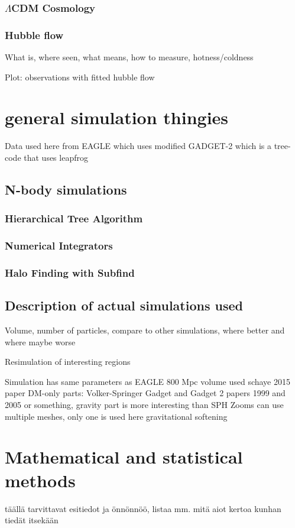 \documentclass[english, oneside]{HYgradu}
\begin{document}
\subsection{$\Lambda$CDM Cosmology}


\subsection{Hubble flow}
What is, where seen, what means, how to measure, hotness/coldness

Plot: observations with fitted hubble flow


\chapter{general simulation thingies}
Data used here from EAGLE which uses modified GADGET-2 which is a tree-code that uses leapfrog
\section{N-body simulations}
\subsection{Hierarchical Tree Algorithm}
\subsection{Numerical Integrators}
\subsection{Halo Finding with Subfind} %

\section{Description of actual simulations used}
Volume, number of particles, compare to other simulations, where better and where maybe worse

Resimulation of interesting regions

Simulation has same parameters as EAGLE
800 Mpc volume used
schaye 2015 paper
DM-only parts: Volker-Springer Gadget and Gadget 2 papers 1999 and 2005 or something,     gravity part is more interesting than SPH 
Zooms can use multiple meshes, only one is used here
gravitational softening


\chapter{Mathematical and statistical methods}
\reversemarginpar
{}
täällä tarvittavat esitiedot ja önnönnöö, listaa mm. mitä aiot kertoa kunhan tiedät itsekään
\end{document}
